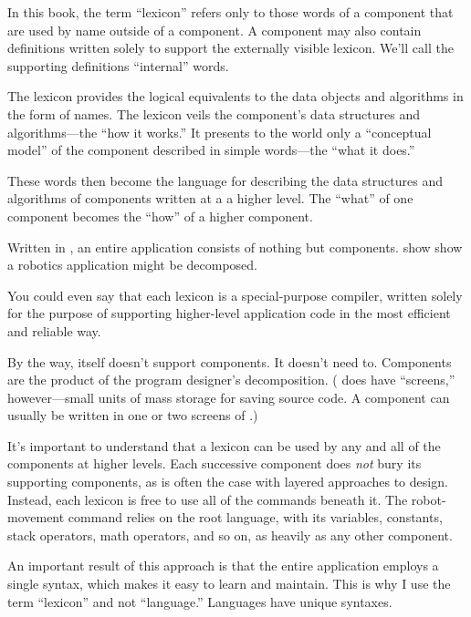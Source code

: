 In this book, the term ``lexicon'' refers only to those words of a
component that are used by name outside of a component. A component
may also contain definitions written solely to support the externally
visible lexicon. We'll call the supporting definitions ``internal''
words.


The lexicon provides the logical equivalents to the data objects and
algorithms in the form of names. The lexicon veils the component's
data structures and algorithms---the ``how it works.'' It presents to
the world only a ``conceptual model'' of the component described in
simple words---the ``what it does.''

These words then become the language for describing the data
structures and algorithms of components written at a a higher level.
The ``what'' of one component becomes the ``how'' of a higher component.


Written in \Forth{}, an entire application consists of nothing but
components.   show show a robotics application might be
decomposed.

You could even say that each lexicon is a special-purpose compiler,
written solely for the purpose of supporting higher-level application
code in the most efficient and reliable way.

By the way, \Forth{} itself doesn't support components. It doesn't need
to. Components are the product of the program designer's decomposition.
(\Forth{} does have ``screens,''%
however---small units of mass storage for saving source code. A
component can usually be written in one or two screens of \Forth{}.)

It's important to understand that a lexicon can be used by any and
all of the components at higher levels. Each successive component
does \emph{not} bury its supporting components, as is often the case
with layered approaches to design. Instead, each lexicon is free to
use all of the commands beneath it. The robot-movement command relies
on the root language, with its variables, constants, stack operators,
math operators, and so on, as heavily as any other component.%
%

An important result of this approach is that the entire application
employs a single syntax, which makes it easy to learn and maintain.
This is why I use the term ``lexicon'' and not ``language.''
Languages have unique syntaxes.%


